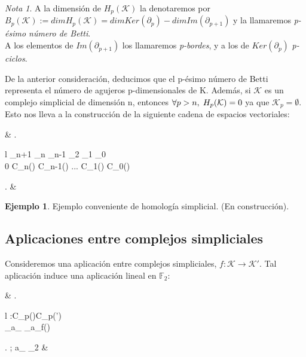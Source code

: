\documentclass[12pt]{article}
\numberwithin{equation}{section}
\theoremstyle{definition}
\newtheorem{ejem}{Ejemplo}
\theoremstyle{remark}
\newtheorem*{remark}{Nota}
\theoremstyle{plain}
\begin{document}
		\begin{remark}
			A la dimensión de $H_{p}(\mathcal{K})$ la denotaremos por $B_{p}(\mathcal{K}):=dim H_{p}(\mathcal{K})=dim Ker(\partial_{p})-dim Im(\partial_{p+1})$ y la llamaremos
			\textit{p-ésimo número de Betti}.\\
			A los elementos de $Im(\partial_{p+1})$ los llamaremos \textit{p-bordes}, y a los de $Ker(\partial_{p})$ \textit{p-ciclos}.
		\end{remark}

		De la anterior consideración, deducimos que el p-ésimo número de Betti representa el número de agujeros p-dimensionales de K. Además, si $\mathcal{K}$ es un complejo simplicial
		de dimensión n, entonces $\forall p > n,\hspace{0.1cm} H_{p}(\mathcal{K})=0$ ya que $\mathcal{K}_{p}=\emptyset$. Esto nos lleva a la construcción de la siguiente cadena de 
		espacios vectoriales:
		\begin{flalign*}
			& \left.
			\begin{array}{l}
				\hspace{0.1cm} \partial_{n+1} \hspace{1.1cm} \partial_{n} \hspace{1.4cm} \partial_{n-1} \hspace{0.9cm} \partial_{2} \hspace{1.3cm} \partial_{1} \hspace{1.2cm} \partial_{0}\\
				0 \rightarrow C_{n}() \rightarrow C_{n-1}() \rightarrow \hspace{0.25cm} ... \hspace{0.25cm} \rightarrow C_{1}() \rightarrow C_{0}() 
			\end{array}
			\right. &
		\end{flalign*}

		\begin{ejem}
			Ejemplo conveniente de homología simplicial. (En construcción).
		\end{ejem}	

	\subsection{Aplicaciones entre complejos simpliciales}

		Consideremos una aplicación entre complejos simpliciales, $f:\mathcal{K}\rightarrow\mathcal{K}'$. Tal aplicación induce una aplicación lineal en $\mathbb{F}_{2}$:
		\begin{flalign*}
			& \left.
			\begin{array}{l}
				:C_{p}()\rightarrow C_{p}(\mathcal{K}')\\[2pt] 
				\hspace{0.45cm} \displaystyle \sum_{}a_{\sigma}\sigma \mapsto 
				\displaystyle \sum_{}a_{\sigma}f(\sigma)
			\end{array}
			\right. ; \hspace{0.25cm} a_{\sigma} \in \mathbb{F}_{2} &
		\end{flalign*}
		
\end{document}
